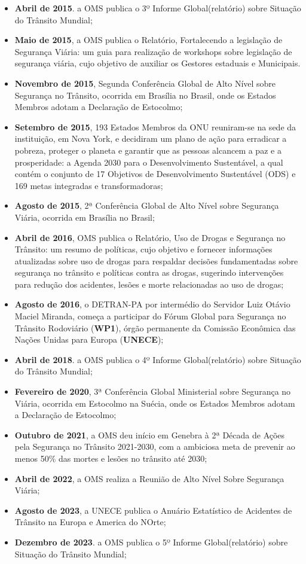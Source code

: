 \documentclass[output=paper,colorlinks,citecolor=green]{langscibook}
\begin{document}
\begin{itemize}
\item \textbf{Abril de 2015}. a OMS publica o 3º Informe Global(relatório) sobre Situação do Trânsito Mundial;
\item \textbf{Maio de 2015}, a OMS publica o Relatório, Fortalecendo a legislação de Segurança Viária: um guia para realização de workshops sobre legislação de segurança viária, cujo objetivo de auxiliar os Gestores estaduais e Municipais.
\item \textbf{Novembro de 2015}, Segunda Conferência Global de Alto Nível sobre Segurança no Trânsito, ocorrida em Brasília no Brasil, onde os Estados Membros adotam a Declaração de Estocolmo;
\item \textbf{Setembro de 2015}, 193 Estados Membros da ONU reuniram-se na sede da instituição, em Nova York, e decidiram um plano de ação para erradicar a pobreza, proteger o planeta e garantir que as pessoas alcancem a paz e a prosperidade: a Agenda 2030 para o Desenvolvimento Sustentável, a qual contém o conjunto de 17 Objetivos de Desenvolvimento Sustentável (ODS) e 169 metas integradas e transformadoras;
\item \textbf{Agosto de 2015}, 2ª Conferência Global de Alto Nível sobre Segurança Viária, ocorrida em Brasília no Brasil;
\item \textbf{Abril de 2016}, OMS publica o Relatório, Uso de Drogas e Segurança no Trânsito: um resumo de políticas, cujo objetivo e fornecer informações atualizadas sobre uso de drogas para respaldar decisões fundamentadas sobre segurança no trânsito e políticas contra as drogas, sugerindo intervenções para redução dos acidentes, lesões e morte relacionadas ao uso de drogas;

\item \textbf{Agosto de 2016}, o DETRAN-PA por intermédio do Servidor Luiz Otávio Maciel Miranda, começa a participar do Fórum Global para Segurança no Trânsito Rodoviário (\textbf{WP1}), órgão permanente da Comissão Econômica das Nações Unidas para Europa (\textbf{UNECE});
\item \textbf{Abril de 2018}. a OMS publica o 4º Informe Global(relatório) sobre Situação do Trânsito Mundial;
\item \textbf{Fevereiro de 2020}, 3ª Conferência Global Ministerial sobre Segurança no Viária, ocorrida em Estocolmo na Suécia, onde os Estados Membros adotam a Declaração de Estocolmo;

\item \textbf{Outubro de 2021}, a OMS deu início em Genebra à 2ª Década de Ações pela Segurança no Trânsito 2021-2030, com a ambiciosa meta de prevenir ao menos 50\% das mortes e lesões no trânsito até 2030;
\item \textbf{Abril de 2022}, a OMS realiza a Reunião de Alto Nível Sobre Segurança Viária;
\item \textbf{Agosto de 2023}, a UNECE publica o Anuário Estatístico de Acidentes de Trânsito na Europa e America do NOrte;
\item \textbf{Dezembro de 2023}. a OMS publica o 5º Informe Global(relatório) sobre Situação do Trânsito Mundial;
\end{itemize}
\end{document}
